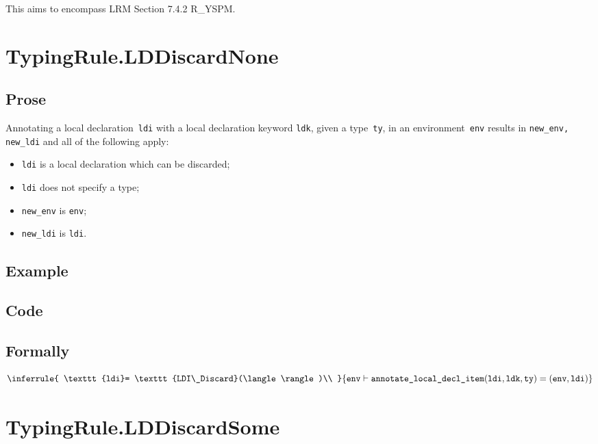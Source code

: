 \documentclass{book}
\newcommand\annotatelocaldeclitem[1]{\texttt{annotate\_local\_decl\_item}(#1)}
\newcommand\tenv[0]{\texttt{env}}
\newcommand\ldi[0]{\texttt{ldi}}
\newcommand\ldk[0]{\texttt{ldk}}
\newcommand\tty[0]{\texttt{ty}}
\begin{document}
This aims to encompass LRM Section 7.4.2 R\_YSPM.

\section{TypingRule.LDDiscardNone \label{sec:TypingRule.LDDiscardNone}}

  \subsection{Prose}
    Annotating a local declaration~\texttt{ldi} with a local declaration keyword \texttt{ldk}, given a type~\texttt{ty}, in
an environment~\texttt{env} results in \texttt{new\_env, new\_ldi} and all of
the following apply:
   \begin{itemize}
   \item \texttt{ldi} is a local declaration which can be discarded;
   \item \texttt{ldi} does not specify a type;
   \item \texttt{new\_env} is \texttt{env};
   \item \texttt{new\_ldi} is \texttt{ldi}.
   \end{itemize}

  \subsection{Example}

  \subsection{Code}

\begin{emptyformal}
    \subsection{Formally}
\[
  \inferrule{
    \ldi = \texttt{LDI\_Discard}(\langle\rangle)\\
  }
  {\tenv \entails \annotatelocaldeclitem{\ldi, \ldk, \tty} = (\tenv, \ldi)}
\]
\end{emptyformal}


\section{TypingRule.LDDiscardSome \label{sec:TypingRule.LDDiscardSome}}
\end{document}
